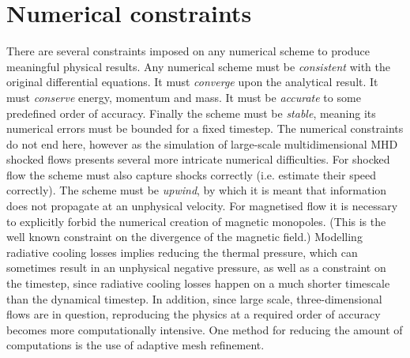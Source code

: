 \section{Numerical constraints}

There are several constraints imposed on any numerical scheme to produce meaningful physical results.
Any numerical scheme must be \emph {consistent} with the original differential equations.
It must \emph{converge} upon the analytical result.
It must \emph{conserve} energy, momentum and mass.
It must be \emph{accurate} to some predefined order of accuracy.
Finally the scheme must be \emph{stable}, meaning its numerical errors must be bounded for a fixed timestep.
The numerical constraints do not end here, however as
the simulation of large-scale multidimensional MHD shocked flows presents several more intricate numerical difficulties.
For shocked flow the scheme must also capture shocks correctly (i.e. estimate their speed correctly).
The scheme must be \emph{upwind}, by which it is meant that information does not propagate at an unphysical velocity.
For magnetised flow it is necessary to explicitly forbid the numerical creation of magnetic monopoles.
(This is the well known constraint on the divergence of the magnetic field.)
Modelling radiative cooling losses implies reducing the thermal pressure, which can sometimes result in an unphysical negative pressure, as well as a constraint on the timestep, since radiative cooling losses happen on a much shorter timescale than the dynamical timestep.
In addition, since large scale, three-dimensional flows are in question, reproducing the physics at a required order of accuracy becomes more computationally intensive. One method for reducing the amount of computations is the use of adaptive mesh refinement.


